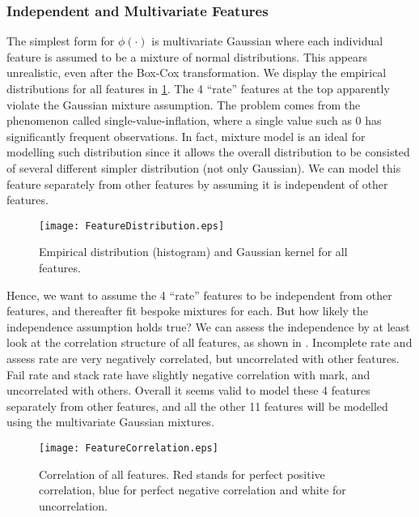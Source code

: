 \subsubsection{Independent and Multivariate Features}

The simplest form for $\phi(\cdot)$ is multivariate Gaussian where each individual feature is assumed to be a mixture of normal distributions. This appears unrealistic, even after the Box-Cox transformation. We display the empirical distributions for all features in \ref{fig:featureDistribution}. The 4 ``rate'' features at the top apparently violate the Gaussian mixture assumption. The problem comes from the phenomenon called	single-value-inflation, where a single value such as 0 has significantly frequent observations. In fact, mixture model is an ideal for modelling such distribution since it allows the overall distribution to be consisted of several different simpler distribution (not only Gaussian). We can model this feature separately from other features by assuming it is independent of other features.

\begin{figure}[!h]
\centering
\texttt{[image: FeatureDistribution.eps]}
\caption{Empirical distribution (histogram) and Gaussian kernel for all features.}
\label{fig:featureDistribution}
\end{figure}

Hence, we want to assume the 4 ``rate'' features to be independent from other features, and thereafter fit bespoke mixtures for each. But how likely the independence assumption holds true? We can assess the independence by at least look at the correlation structure of all features, as shown in . Incomplete rate and assess rate are very negatively correlated, but uncorrelated with other features. Fail rate and stack rate have slightly negative correlation with mark, and uncorrelated with others. Overall it seems valid to model these 4 features separately from other features, and all the other 11 features will be modelled using the multivariate Gaussian mixtures.

\begin{figure}[!h]
\centering
\texttt{[image: FeatureCorrelation.eps]}
\caption{Correlation of all features. Red stands for perfect positive correlation, blue for perfect negative correlation and white for uncorrelation.}
\label{fig:featureCorrelation}
\end{figure}




